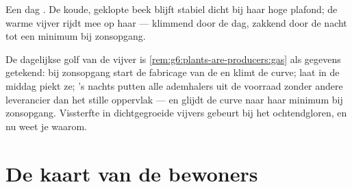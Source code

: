 \begin{omfigure}

{\small Een dag . De koude, geklopte beek blijft stabiel
dicht bij haar hoge plafond; de warme vijver rijdt mee op haar
 --- klimmend door de dag, zakkend door de nacht tot een
minimum bij zonsopgang.}
\end{omfigure}

\begin{example}\label{ex:g7:oxygen-in-the-water:curve}
De dagelijkse golf van de vijver is
\cref{rem:g6:plants-are-producers:gas} als gegevens getekend: bij
zonsopgang start de fabricage van de  en klimt de curve; laat
in de middag piekt ze; 's nachts putten alle ademhalers uit de voorraad
zonder andere leverancier dan het stille oppervlak --- en glijdt de curve
naar haar minimum bij zonsopgang. Vissterfte in dichtgegroeide vijvers
gebeurt bij het ochtendgloren, en nu weet je waarom.
\end{example}

\section{De kaart van de bewoners}

